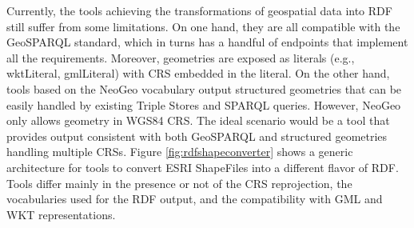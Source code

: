 Currently, the tools achieving the transformations of geospatial data into RDF still suffer from some limitations. On one hand, they are all compatible with the GeoSPARQL standard, which in turns has a handful of endpoints that implement all the requirements. Moreover, geometries are exposed as literals (e.g., wktLiteral, gmlLiteral) with CRS embedded in the literal. On the other hand, tools based on the NeoGeo vocabulary output structured geometries that can be easily handled by existing Triple Stores and SPARQL queries. However, NeoGeo only allows geometry in WGS84 CRS. The ideal scenario would be a tool that provides output consistent with both GeoSPARQL and structured geometries handling multiple CRSs. Figure \ref{fig:rdfshapeconverter} shows a generic architecture for tools to convert ESRI ShapeFiles into a different flavor of RDF. Tools differ mainly in the presence or not of the CRS reprojection, the vocabularies used for the RDF output, and the compatibility with GML and WKT representations.

\begin{figure}[ht!b]
\end{figure}

